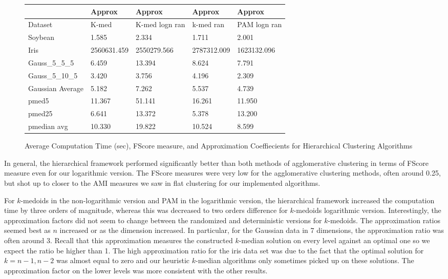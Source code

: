 \documentclass{article}
\begin{document}
\begin{figure*}[h]
\begin{tabular}{ | l | l | l | l | l | }
\hline
	   & Approx & Approx & Approx & Approx \\ \hline
	Dataset & K-med & K-med logn ran & k-med ran & PAM logn ran \\ \hline
	Soybean & 1.585 & 2.334 & 1.711 & 2.001 \\ 
	Iris & 2560631.459 & 2550279.566 & 2787312.009 & 1623132.096 \\ 
	Gauss\_5\_5\_5 & 6.459 & 13.394 & 8.624 & 7.791 \\
	Gauss\_5\_10\_5 &  3.420 & 3.756 & 4.196 & 2.309  \\
	Gaussian Average & 5.182 & 7.262  & 5.537 & 4.739 \\ 
	pmed5 & 11.367 & 51.141 & 16.261 & 11.950 \\ 
	pmed25 & 6.641 & 13.372 & 5.378 & 13.200 \\ 
	pmedian avg & 10.330 & 19.822 & 10.524 & 8.599 \\ \hline
\end{tabular}

\caption{Average Computation Time (sec), FScore measure, and Approximation Coeffiecients for Hierarchical Clustering Algorithms}
\end{figure*}

In general, the hierarchical framework performed significantly better than both methods of agglomerative clustering in terms of FScore measure even for our logarithmic version. The FScore measures were very low for the agglomerative clustering methods, often around 0.25, but shot up to closer to the AMI measures we saw in flat clustering for our implemented algorithms. 

For $k$-medoids in the non-logarithmic version and PAM in the logarithmic version, the hierarchical framework increased the computation time by three orders of magnitude, whereas this was decreased to two orders difference for $k$-medoids logarithmic version. Interestingly, the approximation factors did not seem to change between the randomized and deterministic versions for $k$-medoids. The approximation ratios seemed best as $n$ increased or as the dimension increased. In particular, for the Gaussian data in 7 dimensions, the approximation ratio was often around 3. Recall that this approximation measures the constructed $k$-median solution on every level against an optimal one so we expect the ratio be higher than 1.  The high approximation ratio for the iris data set was due to the fact that the optimal solution for $k = n-1, n-2$ was almost equal to zero and our heuristic $k$-median algorithms only sometimes picked up on these solutions. The approximation factor on the lower levels was more consistent with the other results. 
\end{document}
